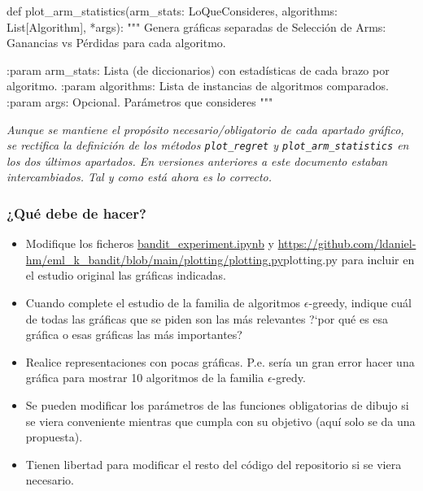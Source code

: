 \documentclass[a4paper, 11pt]{article}
\begin{document}
\begin{itemize}
\begin{pyverbatim}[][fontsize=\scriptsize]
def plot_arm_statistics(arm_stats: LoQueConsideres, 
						algorithms: List[Algorithm], *args):
    """
    Genera gráficas separadas de Selección de Arms: 
    										Ganancias vs Pérdidas para cada algoritmo.

    :param arm_stats: Lista (de diccionarios) con estadísticas de cada brazo por algoritmo.
    :param algorithms: Lista de instancias de algoritmos comparados.
    :param args: Opcional. Parámetros que consideres
    """
\end{pyverbatim}

\end{itemize}

 \textit{Aunque se mantiene el propósito necesario/obligatorio de cada apartado gráfico, se rectifica la definición de los métodos \texttt{plot\_regret}  y \texttt{plot\_arm\_statistics} en los dos últimos apartados. En versiones anteriores a este documento estaban intercambiados. Tal y como está ahora es lo correcto.}


\subsubsection*{¿Qué debe de hacer?}

\begin{itemize}
\item Modifique los ficheros  \href{https://githubtocolab.com/ldaniel-hm/eml_k_bandit/blob/main/bandit_experiment.ipynb}{bandit\_experiment.ipynb} y \url{https://github.com/ldaniel-hm/eml_k_bandit/blob/main/plotting/plotting.py}{plotting.py} para incluir en el estudio original las gráficas indicadas.

\item Cuando complete el estudio de la familia de algoritmos $\epsilon$-greedy, indique cuál de todas las gráficas que se piden son las más relevantes ?`por qué es esa gráfica o esas gráficas las más importantes?
\end{itemize}

\begin{importantbox}
\begin{itemize}
\item Realice representaciones con pocas gráficas. P.e. sería un gran error hacer una gráfica para mostrar 10 algoritmos de la familia $\epsilon$-gredy.

\item Se pueden modificar los parámetros de las funciones obligatorias de dibujo si se viera conveniente mientras que cumpla con su objetivo  (aquí solo se da una propuesta). 

\item Tienen libertad para modificar el resto del código del repositorio si se viera necesario.
\end{itemize}

\end{importantbox}
\end{document}
